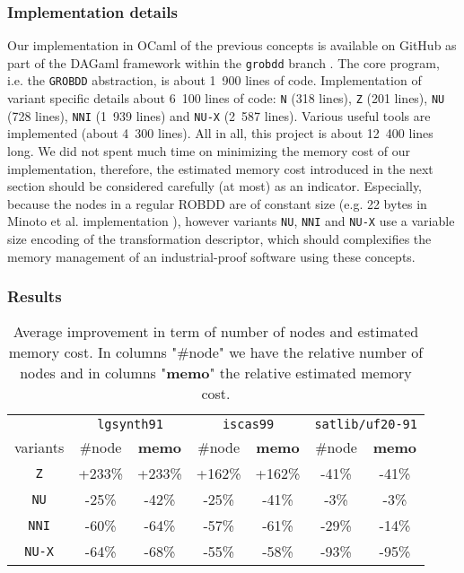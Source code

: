 \documentclass[a4paper,10pt]{article}
\newcommand{\GroBdd}{\texttt{GROBDD}}
\begin{document}
\subsubsection{Implementation details}
Our implementation in OCaml of the previous concepts is available on GitHub as part of the DAGaml framework within the \texttt{grobdd} branch \cite{DAGamlGitHub}.
The core program, i.e. the \GroBdd{} abstraction, is about 1~900 lines of code.
Implementation of variant specific details about 6~100 lines of code: \texttt{N} (318 lines), \texttt{Z} (201 lines), \texttt{NU} (728 lines), \texttt{NNI} (1~939 lines) and \texttt{NU-X} (2~587 lines).
Various useful tools are implemented (about 4~300 lines).
All in all, this project is about 12~400 lines long.
We did not spent much time on minimizing the memory cost of our implementation, therefore, the estimated memory cost introduced in the next section should be considered carefully (at most) as an indicator.
Especially, because the nodes in a regular ROBDD are of constant size (e.g. 22 bytes in Minoto et al. implementation \cite{MinatoVariants}), however variants \texttt{NU}, \texttt{NNI} and \texttt{NU-X} use a variable size encoding of the transformation descriptor, which should complexifies the memory management of an industrial-proof software using these concepts.

\subsubsection{Results}



\begin{table}
\center
\begin{tabular}{c | c | c | c | c | c | c }
& \multicolumn{2}{c|}{\texttt{lgsynth91}} & \multicolumn{2}{c|}{\texttt{iscas99}} & \multicolumn{2}{c}{\texttt{satlib/uf20-91}} \\
variants      & \#node & \textbf{memo} & \#node & \textbf{memo} & \#node & \textbf{memo} \\
\texttt{Z}    & +233\% & +233\%        & +162\% & +162\%        & -41\%  & -41\%        \\
\texttt{NU}   & -25\%  & -42\%         & -25\%  & -41\%         & -3\%   & -3\%         \\
\texttt{NNI}  & -60\%  & -64\%         & -57\%  & -61\%         & -29\%  & -14\%        \\
\texttt{NU-X} & -64\%  & -68\%         & -55\%  & -58\%         & -93\%  & -95\%        \\
\end{tabular}
\caption{Average improvement in term of number of nodes and estimated memory cost.
In columns "\#node" we have the relative number of nodes and in columns "\textbf{memo}" the relative estimated memory cost.
}
\label{results}
\end{table}
\end{document}

